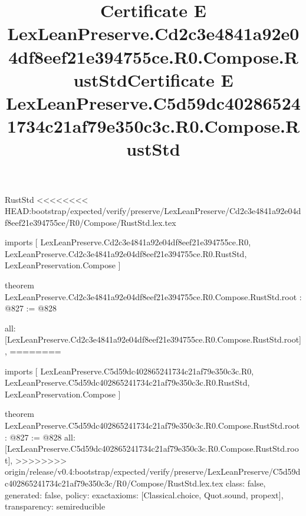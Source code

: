 \begin{lexlean}{RustStd}
<<<<<<<< HEAD:bootstrap/expected/verify/preserve/LexLeanPreserve/Cd2c3e4841a92e04df8eef21e394755ce/R0/Compose/RustStd.lex.tex
\title{Certificate E LexLeanPreserve.Cd2c3e4841a92e04df8eef21e394755ce.R0.Compose.RustStd}
\begin{coremodule}
imports [
  LexLeanPreserve.Cd2c3e4841a92e04df8eef21e394755ce.R0,
  LexLeanPreserve.Cd2c3e4841a92e04df8eef21e394755ce.R0.RustStd,
  LexLeanPreservation.Compose
]

theorem LexLeanPreserve.Cd2c3e4841a92e04df8eef21e394755ce.R0.Compose.RustStd.root : @827 := @828 {
  all: [LexLeanPreserve.Cd2c3e4841a92e04df8eef21e394755ce.R0.Compose.RustStd.root],
========
\title{Certificate E LexLeanPreserve.C5d59dc402865241734c21af79e350c3c.R0.Compose.RustStd}
\begin{coremodule}
imports [
  LexLeanPreserve.C5d59dc402865241734c21af79e350c3c.R0,
  LexLeanPreserve.C5d59dc402865241734c21af79e350c3c.R0.RustStd,
  LexLeanPreservation.Compose
]

theorem LexLeanPreserve.C5d59dc402865241734c21af79e350c3c.R0.Compose.RustStd.root : @827 := @828 {
  all: [LexLeanPreserve.C5d59dc402865241734c21af79e350c3c.R0.Compose.RustStd.root],
>>>>>>>> origin/release/v0.4:bootstrap/expected/verify/preserve/LexLeanPreserve/C5d59dc402865241734c21af79e350c3c/R0/Compose/RustStd.lex.tex
  class: false,
  generated: false,
  policy: exact{axioms: [Classical.choice, Quot.sound, propext]},
  transparency: semireducible
}


\end{coremodule}}
\end{coremodule}
\end{lexlean}
